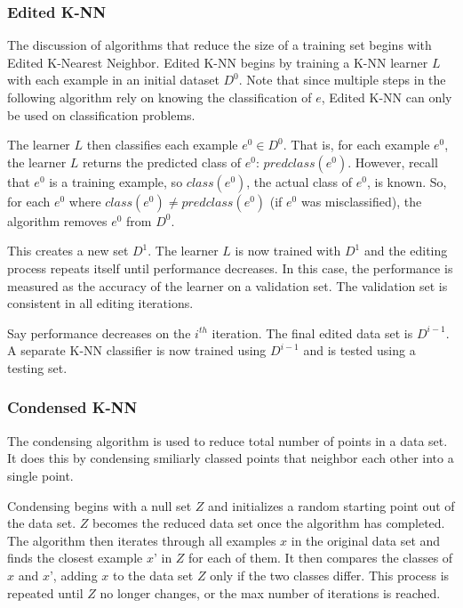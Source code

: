 \documentclass[twoside,11pt]{article}
\begin{document}
\subsubsection{Edited K-NN}
The discussion of algorithms that reduce the size of a training set begins with Edited K-Nearest Neighbor. Edited K-NN begins by training a K-NN learner $L$ with each example in an initial dataset $D^0$. Note that since multiple steps in the following algorithm rely on knowing the classification of $e$, Edited K-NN can only be used on classification problems.

The learner $L$ then classifies each example $e^0 \in D^0$. That is, for each example $e^0$, the learner $L$ returns the predicted class of $e^0$: $predclass(e^0)$. However, recall that $e^0$ is a training example, so $class(e^0)$, the actual class of $e^0$, is known. So, for each $e^0$ where $class(e^0) \neq predclass(e^0)$ (if $e^0$ was misclassified), the algorithm removes $e^0$ from $D^0$.

This creates a new set $D^1$. The learner $L$ is now trained with $D^1$ and the editing process repeats itself until performance decreases. In this case, the performance is measured as the accuracy of the learner on a validation set. The validation set is consistent in all editing iterations.

Say performance decreases on the $i^{th}$ iteration. The final edited data set is $D^{i-1}$. A separate K-NN classifier is now trained using $D^{i-1}$ and is tested using a testing set.





\subsubsection{Condensed K-NN}

The condensing algorithm is used to reduce total number of points in a data set. It does this by condensing smiliarly classed points that neighbor each other into a single point.

Condensing begins with a null set $Z$ and initializes a random starting point out of the data set. $Z$ becomes the reduced data set once the algorithm has completed. The algorithm then iterates through all examples $x$ in the original data set and finds the closest example $x’$ in $Z$ for each of them. It then compares the classes of $x$ and $x’$, adding $x$ to the data set $Z$ only if the two classes differ. This process is repeated until $Z$ no longer changes, or the max number of iterations is reached. 
\end{document}
